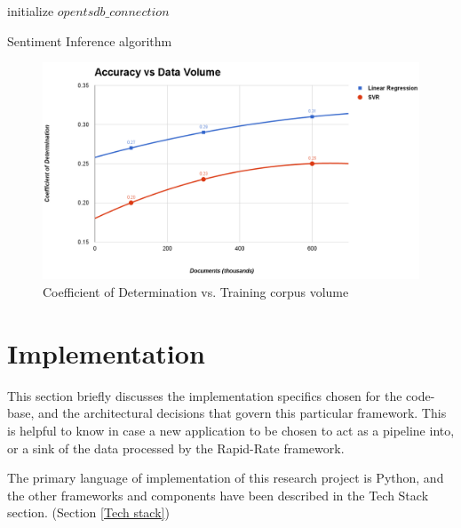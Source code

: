 \documentclass[conference]{IEEEtran}
\begin{document}
\begin{algorithm}[ht] \label{infer_sentiment}
    \DontPrintSemicolon 
    initialize $opentsdb\_connection$
    \;
    \;
    \caption{Sentiment Inference algorithm}
\end{algorithm}

\begin{figure}[ht] \label{fig:accuracy-v-data}
    \centering
    \includegraphics[width=\textwidth]{images/accuracy-vs-data.png}
    \caption{Coefficient of Determination vs. Training corpus volume}
\end{figure}

\section{Implementation}
    This section briefly discusses the implementation specifics chosen for the code-base, and the architectural decisions that govern this particular framework. 
    This is helpful to know in case a new application to be chosen to act as a pipeline into, or a sink of the data processed by the Rapid-Rate framework.

    The primary language of implementation of this research project is Python, and the other frameworks and components have been described in the Tech Stack section. (Section \ref{Tech stack})
\end{document}
